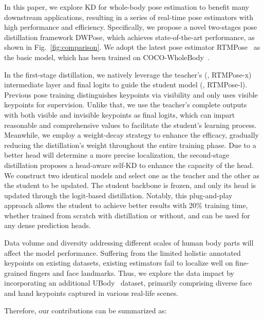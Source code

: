 \documentclass[10pt,twocolumn,letterpaper]{article}
\begin{document}
In this paper, we explore KD for whole-body pose estimation to benefit many downstream applications, resulting in a series of real-time pose estimators with high performance and efficiency. Specifically, we propose a novel two-stages pose distillation framework DWPose, which achieves state-of-the-art performance, as shown in Fig.~\ref{fig:comparison}. We adopt the latest pose estimator RTMPose~\cite{jiang2023rtmpose} as the basic model, which has been trained on COCO-WholeBody~\cite{jin2020whole,lin2014microsoft}.

In the first-stage distillation, we natively leverage the teacher's (\eg, RTMPose-x) intermediate layer and final logits to guide the student model (\eg, RTMPose-l). Previous pose training distinguishes keypoints via visibility and only uses visible keypoints for supervision. Unlike that, we use the teacher's complete outputs with both visible and invisible keypoints as final logits, which can impart reasonable and comprehensive values to facilitate the student's learning process. Meanwhile, we employ a weight-decay strategy to enhance the efficacy, gradually reducing the distillation's weight throughout the entire training phase. Due to a better head will determine a more precise localization, the second-stage distillation proposes a head-aware self-KD to enhance the capacity of the head. We construct two identical models and select one as the teacher and the other as the student to be updated. The student backbone is frozen, and only its head is updated through the logit-based distillation. Notably, this plug-and-play approach allows the student to achieve better results with 20\% training time, whether trained from scratch with distillation or without, and can be used for any dense prediction heads.

Data volume and diversity addressing different scales of human body parts will affect the model performance. Suffering from the limited holistic annotated keypoints on existing datasets, existing estimators fail to localize well on fine-grained fingers and face landmarks. Thus, we explore the data impact by incorporating an additional UBody~\cite{lin2023one} dataset, primarily comprising diverse face and hand keypoints captured in various real-life scenes. 

Therefore, our contributions can be summarized as:
\end{document}

